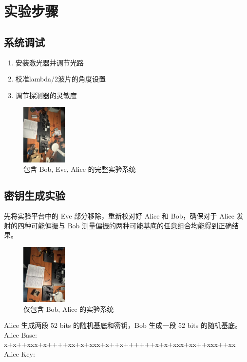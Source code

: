\documentclass{ctexart}
\begin{document}
\section{实验步骤}
\subsection{系统调试}
\begin{enumerate}
\item 安装激光器并调节光路
\item 校准lambda/2波片的角度设置
\item 调节探测器的灵敏度
\end{enumerate}

\begin{figure}[htbp]
    \centering
    \includegraphics[width=0.2\textwidth,height=0.3\textwidth]{pictures/微信图片_20241031162855.jpg}
    \caption{包含 Bob, Eve, Alice 的完整实验系统}
\end{figure}

\subsection{密钥生成实验}
先将实验平台中的 Eve 部分移除，重新校对好 Alice 和 Bob，确保对于 Alice 发射的四种可能偏振与 Bob 测量偏振的两种可能基底的任意组合均能得到正确结果。

\begin{figure}[htbp]
    \centering
    \includegraphics[width=0.2\textwidth,height=0.3\textwidth]{pictures/微信图片_20241031162758.jpg}
    \caption{仅包含 Bob, Alice 的实验系统}
\end{figure}

Alice 生成两段 52 bits 的随机基底和密钥，Bob 生成一段 52 bits 的随机基底。
    Alice Base: x+x++xxx+x++++xx+x+xxx+x++x++++++x+x+xxx+xx++xxx++xx
    Alice Key:  
    
\end{document}
